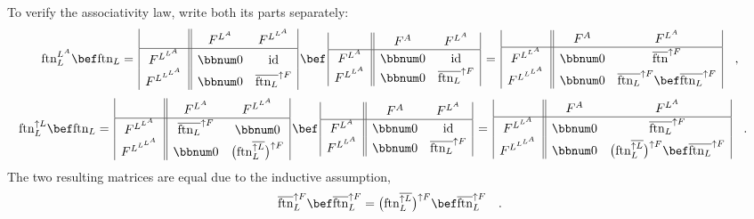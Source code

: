 To verify the associativity law, write both its parts separately:
\[
\text{ftn}_{L}^{L^{A}}\bef\text{ftn}_{L}=\,\begin{array}{|c||cc|}
 & F^{L^{A}} & F^{L^{L^{A}}}\\
\hline F^{L^{L^{A}}} & \bbnum 0 & \text{id}\\
F^{L^{L^{L^{A}}}} & \bbnum 0 & \overline{\text{ftn}_{L}}^{\uparrow F}
\end{array}\,\bef\,\begin{array}{|c||cc|}
 & F^{A} & F^{L^{A}}\\
\hline F^{L^{A}} & \bbnum 0 & \text{id}\\
F^{L^{L^{A}}} & \bbnum 0 & \overline{\text{ftn}_{L}}^{\uparrow F}
\end{array}\,=\,\begin{array}{|c||cc|}
 & F^{A} & F^{L^{A}}\\
\hline F^{L^{L^{A}}} & \bbnum 0 & \overline{\text{ftn}}^{\uparrow F}\\
F^{L^{L^{L^{A}}}} & \bbnum 0 & \overline{\text{ftn}_{L}}^{\uparrow F}\bef\overline{\text{ftn}_{L}}^{\uparrow F}
\end{array}\quad,
\]
\[
\negthickspace\negthickspace\negthickspace\negthickspace\text{ftn}_{L}^{\uparrow L}\bef\text{ftn}_{L}=\,\begin{array}{|c||cc|}
 & F^{L^{A}} & F^{L^{L^{A}}}\\
\hline F^{L^{L^{A}}} & \overline{\text{ftn}_{L}}^{\uparrow F} & \bbnum 0\\
F^{L^{L^{L^{A}}}} & \bbnum 0 & \big(\text{ftn}_{L}^{\overline{\uparrow L}}\big)^{\uparrow F}
\end{array}\,\bef\,\begin{array}{|c||cc|}
 & F^{A} & F^{L^{A}}\\
\hline F^{L^{A}} & \bbnum 0 & \text{id}\\
F^{L^{L^{A}}} & \bbnum 0 & \overline{\text{ftn}_{L}}^{\uparrow F}
\end{array}\,=\,\begin{array}{|c||cc|}
 & F^{A} & F^{L^{A}}\\
\hline F^{L^{L^{A}}} & \bbnum 0 & \overline{\text{ftn}_{L}}^{\uparrow F}\\
F^{L^{L^{L^{A}}}} & \bbnum 0 & \big(\text{ftn}_{L}^{\overline{\uparrow L}}\big)^{\uparrow F}\bef\overline{\text{ftn}_{L}}^{\uparrow F}
\end{array}\quad.
\]
The two resulting matrices are equal due to the inductive assumption,
\[
\overline{\text{ftn}}_{L}^{\uparrow F}\bef\overline{\text{ftn}}_{L}^{\uparrow F}=\big(\text{ftn}_{L}^{\overline{\uparrow L}}\big)^{\uparrow F}\bef\overline{\text{ftn}}_{L}^{\uparrow F}\quad.
\]

